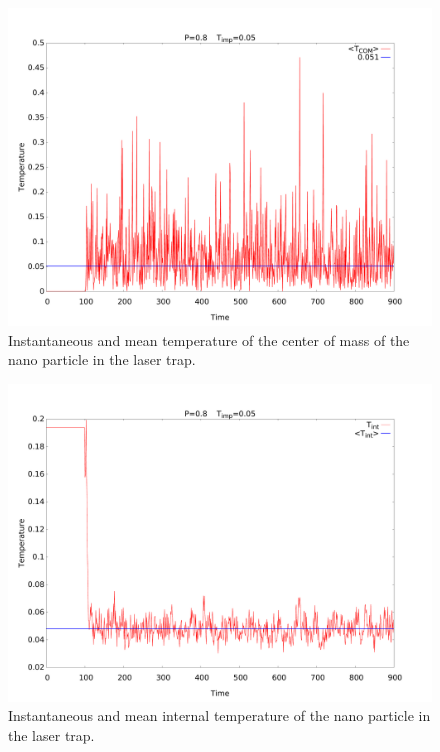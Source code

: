 \documentclass[12pt]{article}
\begin{document}
\begin{figure}[h]
    \begin{center}
        \includegraphics[scale=0.4]{images/vcomsqd.pdf}
        \caption{Instantaneous and mean temperature of the center of mass of the nano particle in the laser trap.}
        \label{fig:vcomsqdequib}
    \end{center}
\end{figure}
\begin{figure}[h]
    \begin{center}
        \includegraphics[scale=0.4]{images/t_int.pdf}
        \caption{Instantaneous and mean internal temperature of the nano particle in the laser trap.}
        \label{fig:internalequib}
    \end{center}
\end{figure}
\end{document}
